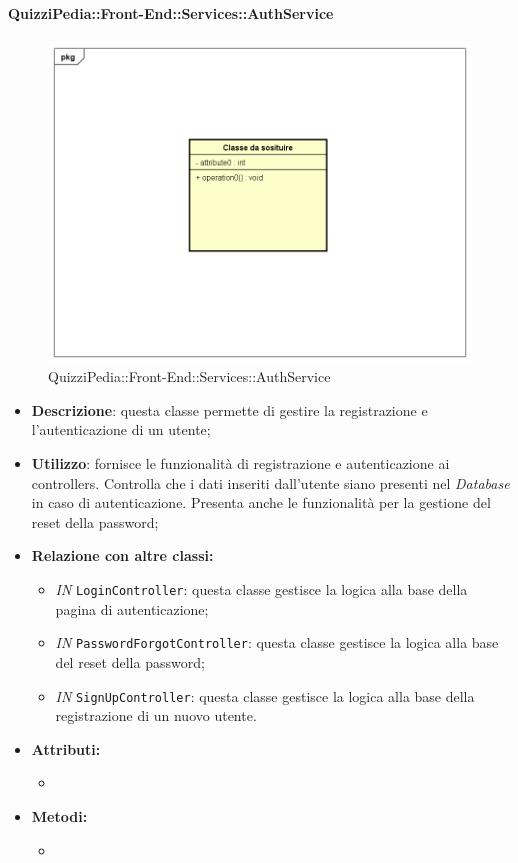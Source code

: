 \paragraph{QuizziPedia::Front-End::Services::AuthService}
\begin{figure}
	\centering
	\includegraphics[scale=0.45]{UML/Classi/Front-End/Temporanea.png}
	\caption{QuizziPedia::Front-End::Services::AuthService}
\end{figure}
\begin{itemize}
	\item \textbf{Descrizione}: questa classe permette di gestire la registrazione e l'autenticazione di un utente;
	\item \textbf{Utilizzo}: fornisce le funzionalità di registrazione e autenticazione ai controllers. Controlla che i dati inseriti dall'utente siano presenti nel \textit{Database} in caso di autenticazione. Presenta anche le funzionalità per la gestione del reset della password;
	\item \textbf{Relazione con altre classi:}
	\begin{itemize}
		\item \textit{IN} \texttt{LoginController}: questa classe gestisce la logica alla base della pagina di autenticazione;
		\item \textit{IN} \texttt{PasswordForgotController}: questa classe gestisce la logica alla base del reset della password;
		\item \textit{IN} \texttt{SignUpController}: questa classe gestisce la logica alla base della registrazione di un nuovo utente.
	\end{itemize}
	\item \textbf{Attributi:}
	\begin{itemize}
		\item 
	\end{itemize}
	\item \textbf{Metodi:}
	\begin{itemize}
		\item 
	\end{itemize}
\end{itemize}

